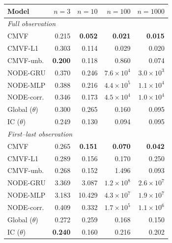 \begin{tabular}{lrrrr}
\toprule
Model & $n{=}3$ & $n{=}10$ & $n{=}100$ & $n{=}1000$ \\
\midrule
\multicolumn{5}{l}{\emph{Full observation}} \\
CMVF & 0.215 & \textbf{0.052} & \textbf{0.021} & \textbf{0.015} \\
CMVF-L1 & 0.303 & 0.114 & 0.029 & 0.020 \\
CMVF-unb. & \textbf{0.200} & 0.118 & 0.860 & 0.074 \\
NODE-GRU & 0.370 & 0.246 & $7.6\!\times\!10^{4}$ & $3.0\!\times\!10^{3}$ \\
NODE-MLP & 0.388 & 0.216 & $4.4\!\times\!10^{5}$ & $1.1\!\times\!10^{4}$ \\
NODE-corr. & 0.346 & 0.173 & $4.5\!\times\!10^{4}$ & $1.0\!\times\!10^{4}$ \\
Global ($\theta$) & 0.300 & 0.265 & 0.160 & 0.095 \\
IC ($\theta$) & 0.249 & 0.130 & 0.094 & 0.095 \\
\midrule
\multicolumn{5}{l}{\emph{First--last observation}} \\
CMVF & 0.265 & \textbf{0.151} & \textbf{0.070} & \textbf{0.042} \\
CMVF-L1 & 0.289 & 0.156 & 0.170 & 0.250 \\
CMVF-unb. & 0.268 & 0.152 & 1.496 & 0.093 \\
NODE-GRU & 3.369 & 3.087 & $1.2\!\times\!10^{8}$ & $2.6\!\times\!10^{7}$ \\
NODE-MLP & 3.183 & 10.429 & $4.3\!\times\!10^{7}$ & $1.9\!\times\!10^{7}$ \\
NODE-corr. & 0.409 & 0.332 & $1.7\!\times\!10^{5}$ & $1.1\!\times\!10^{6}$ \\
Global ($\theta$) & 0.272 & 0.259 & 0.168 & 0.150 \\
IC ($\theta$) & \textbf{0.240} & 0.160 & 0.216 & 0.202 \\
\bottomrule
\end{tabular}
